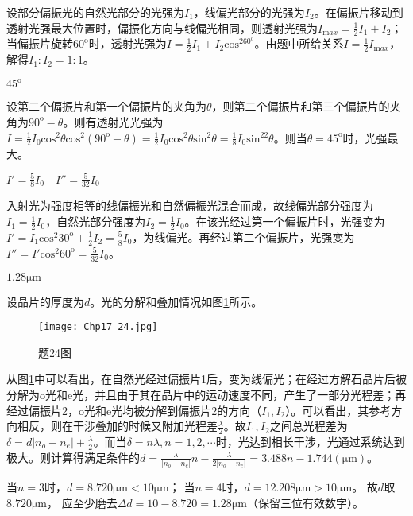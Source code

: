 \solve 设部分偏振光的自然光部分的光强为$I_1$，线偏光部分的光强为$I_2$。在偏振片移动到透射光强最大位置时，偏振化方向与线偏光相同，则透射光强为$I_{\mathrm max}=\frac{1}{2}I_1+I_2$；当偏振片旋转$60^{\mathrm{o}}$时，透射光强为$I=\frac{1}{2}I_1+I_2\mathrm{cos}^260^{\mathrm{o}}$。由题中所给关系$I=\frac{1}{2}I_{\mathrm max}$，解得$I_1:I_2=1:1$。

\exercise $45^{\mathrm{o}}$

\solve 设第二个偏振片和第一个偏振片的夹角为$\theta$，则第二个偏振片和第三个偏振片的夹角为$90^{\mathrm{o}}-\theta$。则有透射光光强为$I=\frac{1}{2}I_0\mathrm{cos}^2\theta\mathrm{cos}^2(90^{\mathrm{o}}-\theta)=\frac{1}{2}I_0\mathrm{cos}^2\theta\mathrm{sin}^2\theta=\frac{1}{8}I_0\mathrm{sin}^22\theta$。则当$\theta=45^{\mathrm{o}}$时，光强最大。

\exercise $I'=\frac{5}{8}I_0$$\quad$$I''=\frac{5}{32}I_0$

\solve 入射光为强度相等的线偏振光和自然偏振光混合而成，故线偏光部分强度为$I_1=\frac{1}{2}I_0$，自然光部分强度为$I_2=\frac{1}{2}I_0$。在该光经过第一个偏振片时，光强变为$I'=I_1\mathrm{cos}^2 30^{\mathrm{o}}+\frac{1}{2}I_2=\frac{5}{8}I_0$，为线偏光。再经过第二个偏振片，光强变为$I''=I'\mathrm{cos}^2 60^{\mathrm{o}}=\frac{5}{32}I_0$。

\exercise $1.28\mathrm{\mu m}$

\solve 设晶片的厚度为$d$。光的分解和叠加情况如图\ref{24}所示。

\begin{figure}[htbp]
	\centering
	\texttt{[image: Chp17\_24.jpg]}
	\caption{题24图}
	\label{24}
\end{figure}

从图\ref{24}中可以看出，在自然光经过偏振片1后，变为线偏光；在经过方解石晶片后被分解为o光和e光，并且由于其在晶片中的运动速度不同，产生了一部分光程差；再经过偏振片2，o光和e光均被分解到偏振片2的方向（$I_1,I_2$）。可以看出，其参考方向相反，则在干涉叠加的时候又附加光程差$\frac{\lambda}{2}$。故$I_1,I_2$之间总光程差为$\delta=d|n_o-n_e|+\frac{\lambda}{2}$。而当$\delta=n\lambda,n=1,2,\cdots$时，光达到相长干涉，光通过系统达到极大。则计算得满足条件的$d=\frac{\lambda}{|n_o-n_e|}n-\frac{\lambda}{2|n_o-n_e|}=3.488n-1.744(\mathrm{\mu m})$。

当$n=3$时，$d=8.720 \mathrm{\mu m}<10 \mathrm{\mu m}$；
当$n=4$时，$d=12.208 \mathrm{\mu m}>10 \mathrm{\mu m}$。
故$d$取$8.720 \mathrm{\mu m}$，
应至少磨去$\Delta d=10-8.720=1.28 \mathrm{\mu m}$（保留三位有效数字）。
